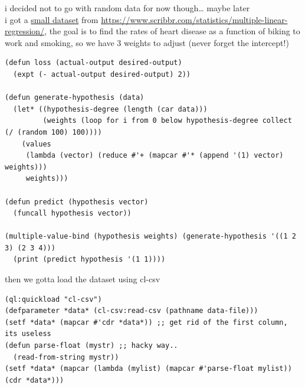 \documentclass[a4paper,12pt]{article}
\begin{document}
i decided not to go with random data for now though\ldots{} maybe later\\
i got a \href{file:///home/mahmooz/brain/notes/data/98/c4ead7-c672-419f-84c2-f7f147be1111/heart.data.csv}{small dataset} from \url{https://www.scribbr.com/statistics/multiple-linear-regression/}, the goal is to find the rates of heart disease as a function of biking to work and smoking, so we have 3 weights to adjust (never forget the intercept!)\\
\lstset{language=Lisp,label= ,caption= ,captionpos=b,numbers=none}
\begin{lstlisting}
(defun loss (actual-output desired-output)
  (expt (- actual-output desired-output) 2))

(defun generate-hypothesis (data)
  (let* ((hypothesis-degree (length (car data)))
         (weights (loop for i from 0 below hypothesis-degree collect (/ (random 100) 100))))
    (values
     (lambda (vector) (reduce #'+ (mapcar #'* (append '(1) vector) weights)))
     weights)))

(defun predict (hypothesis vector)
  (funcall hypothesis vector))

(multiple-value-bind (hypothesis weights) (generate-hypothesis '((1 2 3) (2 3 4)))
  (print (predict hypothesis '(1 1))))
\end{lstlisting}

then we gotta load the dataset using cl-csv\\
\lstset{language=Lisp,label= ,caption= ,captionpos=b,numbers=none}
\begin{lstlisting}
(ql:quickload "cl-csv")
(defparameter *data* (cl-csv:read-csv (pathname data-file)))
(setf *data* (mapcar #'cdr *data*)) ;; get rid of the first column, its useless
(defun parse-float (mystr) ;; hacky way..
  (read-from-string mystr))
(setf *data* (mapcar (lambda (mylist) (mapcar #'parse-float mylist)) (cdr *data*)))
\end{lstlisting}
\end{document}
